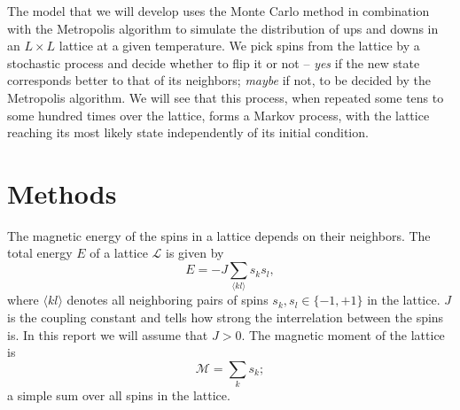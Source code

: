 \documentclass[]{article}
\begin{document}
The model that we will develop uses the Monte Carlo method in combination with the Metropolis algorithm to simulate the distribution of ups and downs in an $L \times L$ lattice at a given temperature. We pick spins from the lattice by a stochastic process and decide whether to flip it or not -- \textit{yes} if the new state corresponds better to that of its neighbors; \textit{maybe} if not, to be decided by the Metropolis algorithm. We will see that this process, when repeated some tens to some hundred times over the lattice, forms a Markov process, with the lattice reaching its most likely state independently of its initial condition.



\section{Methods} \label{sec:methods}


The magnetic energy of the spins in a lattice depends on their neighbors. The total energy $E$ of a lattice $\mathcal{L}$ is given by
\begin{equation} \label{eq:e-sum}
	E = -J \sum_{\langle kl \rangle} s_k s_l,
\end{equation}
where $\langle kl \rangle$ denotes all neighboring pairs of spins $s_k, s_l \in \{ -1, +1\}$ in the lattice. $J$ is the coupling constant and tells how strong the interrelation between the spins is. In this report we will assume that $J > 0$. The magnetic moment of the lattice is
\begin{equation} \label{eq:m-sum}
	\mathcal{M} = \sum_{k} s_k;
\end{equation}
a simple sum over all spins in the lattice.
\end{document}
